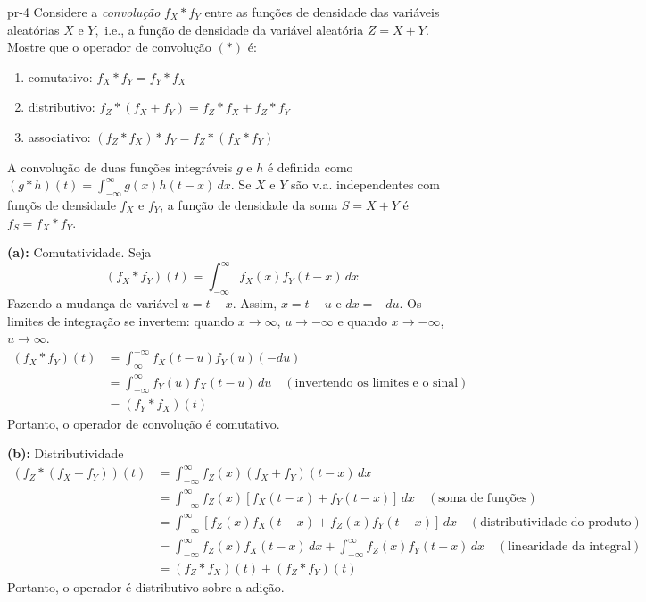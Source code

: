 \begin{problema}{}{pr-4}
	Considere  a {\it convolução} $f_X * f_Y$ entre as funções de densidade das variáveis aleatórias  $X$ e $Y,$ i.e., a função de densidade da variável aleatória $Z=X+Y.$ Mostre que o operador de convolução $ ( * )$ é: 
	\begin{enumerate}
		\item comutativo: $f_X * f_Y = f_Y * f_X$
		\item distributivo: $f_Z*(f_X+f_Y ) = f_Z*f_X+f_Z*f_Y$
		\item  associativo: $(f_Z * f_X) * f_Y = f_Z *(f_X * f_Y )$
	\end{enumerate}
\end{problema}


{\small
	
A convolução de duas funções integráveis $g$ e $h$ é definida como $(g * h)(t) = \int_{-\infty}^{\infty} g(x) h(t-x) \,dx$. Se $X$ e $Y$ são v.a. independentes com funçõs de densidade $f_X$ e $f_Y$, a função de densidade da soma $S=X+Y$ é $f_S = f_X * f_Y$.
	
	{\bf (a):} Comutatividade. Seja
	$$ (f_X * f_Y)(t) = \int_{-\infty}^{\infty} f_X(x) f_Y(t-x) \,dx $$
	Fazendo a mudança de variável $u = t-x$. Assim, $x = t-u$ e $dx = -du$. Os limites de integração se invertem: quando $x \to \infty$, $u \to -\infty$ e quando $x \to -\infty$, $u \to \infty$.
	\begin{align*}
		(f_X * f_Y)(t) &= \int_{\infty}^{-\infty} f_X(t-u) f_Y(u) (-du) \\
		&= \int_{-\infty}^{\infty} f_Y(u) f_X(t-u) \,du \quad (\text{invertendo os limites e o sinal}) \\
		&= (f_Y * f_X)(t)
	\end{align*}
	Portanto, o operador de convolução é comutativo.
	
	{\bf (b):} Distributividade
		\begin{align*}
		(f_Z * (f_X+f_Y))(t) &= \int_{-\infty}^{\infty} f_Z(x) (f_X+f_Y)(t-x) \,dx \\
		&= \int_{-\infty}^{\infty} f_Z(x) [f_X(t-x) + f_Y(t-x)] \,dx \quad (\text{soma de funções}) \\
		&= \int_{-\infty}^{\infty} [f_Z(x)f_X(t-x) + f_Z(x)f_Y(t-x)] \,dx \quad (\text{distributividade do produto}) \\
		&= \int_{-\infty}^{\infty} f_Z(x)f_X(t-x) \,dx + \int_{-\infty}^{\infty} f_Z(x)f_Y(t-x) \,dx \quad (\text{linearidade da integral}) \\
		&= (f_Z * f_X)(t) + (f_Z * f_Y)(t)
	\end{align*}
	Portanto, o operador é distributivo sobre a adição.
	
}

